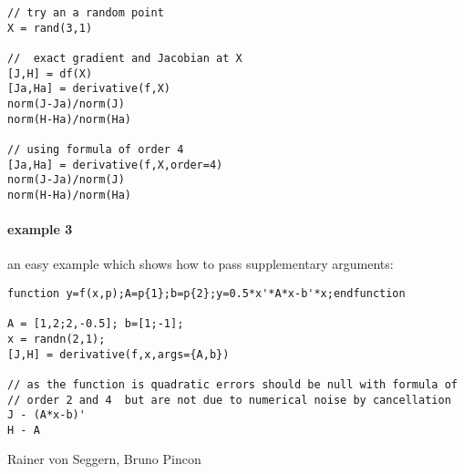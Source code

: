 \begin{examples}
\begin{Verbatim}
// try an a random point
X = rand(3,1)

//  exact gradient and Jacobian at X
[J,H] = df(X)
[Ja,Ha] = derivative(f,X)
norm(J-Ja)/norm(J)
norm(H-Ha)/norm(Ha)

// using formula of order 4
[Ja,Ha] = derivative(f,X,order=4)
norm(J-Ja)/norm(J)
norm(H-Ha)/norm(Ha)
\end{Verbatim}
  
\paragraph{example 3} an easy example which shows how to pass
supplementary arguments:
\begin{Verbatim}
function y=f(x,p);A=p{1};b=p{2};y=0.5*x'*A*x-b'*x;endfunction

A = [1,2;2,-0.5]; b=[1;-1]; 
x = randn(2,1); 
[J,H] = derivative(f,x,args={A,b}) 

// as the function is quadratic errors should be null with formula of 
// order 2 and 4  but are not due to numerical noise by cancellation 
J - (A*x-b)' 
H - A
\end{Verbatim}

\end{examples}


\begin{manseealso}
\end{manseealso}

\begin{authors}
  Rainer von Seggern, Bruno Pincon
\end{authors}
